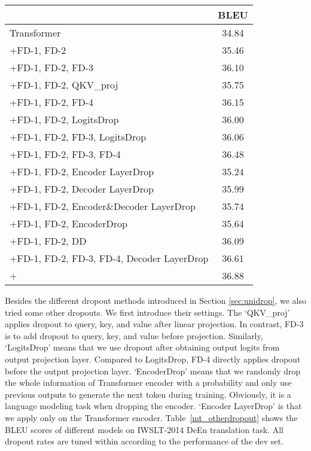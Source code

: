 \documentclass[11pt]{article}
\begin{document}
\begin{table*}[!htbp]
\centering
{
		\centering
		\begin{tabular}{l |c}
		    \hline
		     & BLEU \\
			\hline
			Transformer & 34.84 \\ \hline
			+FD-1, FD-2 & 35.46 \\ \hline
			+FD-1, FD-2, FD-3 & 36.10 \\
			+FD-1, FD-2, QKV\_proj & 35.75 \\
			+FD-1, FD-2, FD-4 & 36.15 \\ 
			+FD-1, FD-2, LogitsDrop & 36.00 \\
			+FD-1, FD-2, FD-3, LogitsDrop & 36.06 \\ 
			+FD-1, FD-2, FD-3, FD-4 & 36.48 \\ 
			\hline
			+FD-1, FD-2, Encoder LayerDrop & 35.24 \\
			+FD-1, FD-2, Decoder LayerDrop & 35.99 \\
			+FD-1, FD-2, Encoder\&Decoder LayerDrop & 35.74 \\
			+FD-1, FD-2, EncoderDrop & 35.64 \\ 
			\hline
			+FD-1, FD-2, DD & 36.09 \\
			\hline
			+FD-1, FD-2, FD-3, FD-4, Decoder LayerDrop & 36.61 \\
			\hline
			+ & 36.88 \\
			\hline
           
	\end{tabular} }
	\caption{The results of different dropouts on IWSLT14 DeEn translation task.} 
	\label{mt_otherdropout}
\end{table*}

Besides the different dropout methods introduced in Section \ref{sec:unidrop}, we also tried some other dropouts. We first introduce their settings. The `QKV\_proj' applies dropout to query, key, and value after linear projection. In contrast, FD-3 is to add dropout to query, key, and value before projection. Similarly, `LogitsDrop' means that we use dropout after obtaining output logits from output projection layer. Compared to LogitsDrop, FD-4 directly applies dropout before the output projection layer. `EncoderDrop' means that we randomly drop the whole information of Transformer encoder with a probability and only use previous outputs to generate the next token during training. Obviously, it is a language modeling task when dropping the encoder. `Encoder LayerDrop' is that we apply  only on the Transformer encoder.  Table~\ref{mt_otherdropout} shows the BLEU scores of different models on IWSLT-2014 DeEn translation task. All dropout rates are tuned within  according to the performance of the dev set.
\end{document}

